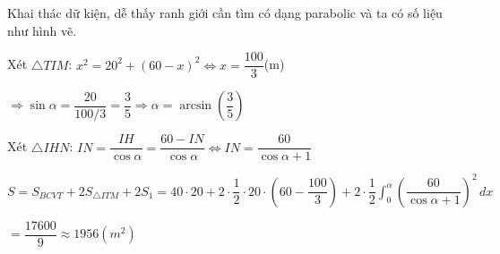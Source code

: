 \documentclass[twoside,final]{hcmut-report}
\begin{document}
Khai thác dữ kiện, dễ thấy ranh giới cần tìm có dạng parabolic và ta có số liệu như hình vẽ.\par
Xét $\triangle TIM$: $x^2 = 20^2 + (60-x)^2 \Leftrightarrow x = \dfrac{100}{3}$(m)\par
$\Rightarrow \sin\alpha = \dfrac{20}{100/3} = \dfrac{3}{5} \Rightarrow\alpha=\arcsin(\dfrac{3}{5})$\par
Xét $\triangle IHN$: $IN = \dfrac{IH}{\cos\alpha} = \dfrac{60 - IN}{\cos\alpha} \Leftrightarrow IN = \dfrac{60}{\cos\alpha + 1}$\par
$S = S_{BCVT} + 2S_{\triangle ITM} + 2S_1 = 40\cdot 20 + 2\cdot\dfrac{1}{2}\cdot 20\cdot(60-\dfrac{100}{3}) + 2\cdot\dfrac{1}{2}\displaystyle\int_{0}^{\alpha}(\dfrac{60}{\cos\alpha + 1})^2\,dx$\par
\hspace*{1em}$= \dfrac{17600}{9} \approx 1956(m^2)$
\end{document}

